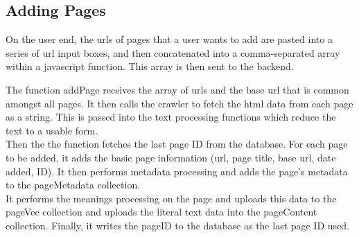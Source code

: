 \subsection{Adding Pages}
On the user end, the urls of pages that a user wants to add are pasted into a series of url input boxes, and then concatenated into a comma-separated array within a javascript function. This array is then sent to the backend.

The function addPage receives the array of urls and the base url that is common amongst all pages. It then calls the crawler to fetch the html data from each page as a string. This is passed into the text processing functions which reduce the text to a usable form. \\
Then the the function fetches the last page ID from the database. For each page to be added, it adds the basic page information (url, page title, base url, date added, ID). It then performs metadata processing and adds the page's metadata to the pageMetadata collection. \\
It performs the meanings processing on the page and uploads this data to the pageVec collection and uploads the literal text data into the pageContent collection. Finally, it writes the pageID to the database as the last page ID used.
